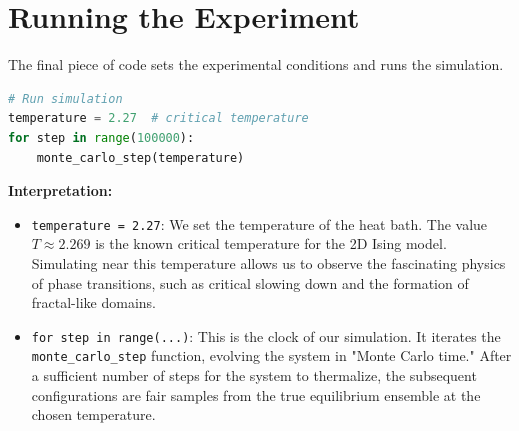 \documentclass[10pt, letterpaper]{article}
\begin{document}
\section{Running the Experiment}
The final piece of code sets the experimental conditions and runs the simulation.
\begin{lstlisting}[language=Python, caption={The main simulation loop.}]
# Run simulation
temperature = 2.27  # critical temperature
for step in range(100000):
    monte_carlo_step(temperature)
\end{lstlisting}
\textbf{Interpretation:}
\begin{itemize}
    \item \texttt{temperature = 2.27}: We set the temperature of the heat bath. The value $T \approx 2.269$ is the known critical temperature for the 2D Ising model. Simulating near this temperature allows us to observe the fascinating physics of phase transitions, such as critical slowing down and the formation of fractal-like domains.
    \item \texttt{for step in range(...)}: This is the clock of our simulation. It iterates the \texttt{monte\_carlo\_step} function, evolving the system in "Monte Carlo time." After a sufficient number of steps for the system to thermalize, the subsequent configurations are fair samples from the true equilibrium ensemble at the chosen temperature. %
\end{itemize}
\end{document}
